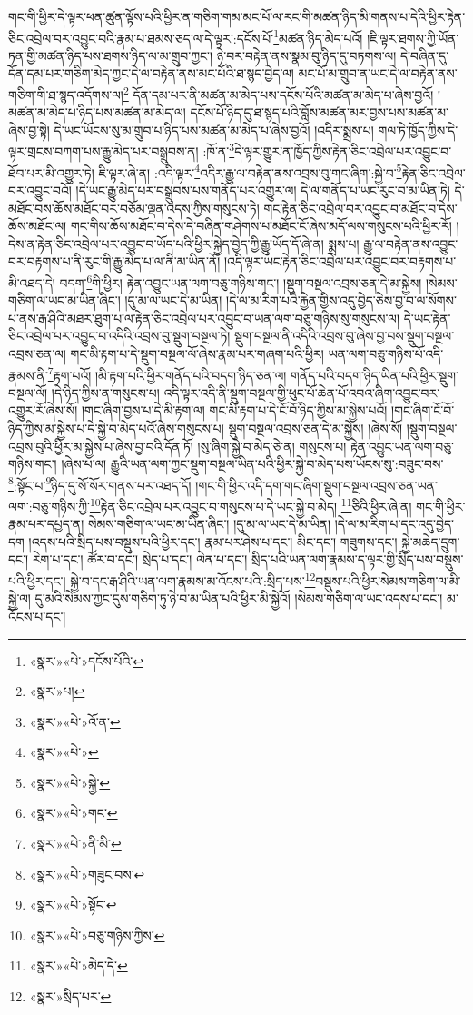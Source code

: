 གང་གི་ཕྱིར་དེ་ལྟར་ཕན་ཚུན་ལྟོས་པའི་ཕྱིར་ན་གཅིག་གམ་མང་པོ་ལ་རང་གི་མཚན་ཉིད་མི་གནས་པ་དེའི་ཕྱིར་རྟེན་ཅིང་འབྲེལ་བར་འབྱུང་བའི་རྣམ་པ་ཐམས་ཅད་ལ་དེ་ལྟར་:དངོས་པོ་\footnote{«སྣར་»«པེ་»དངོས་པོའི་}མཚན་ཉིད་མེད་པའོ། །ཇི་ལྟར་ཐགས་ཀྱི་ཡོན་ཏན་གྱི་མཚན་ཉིད་པས་ཐགས་ཉིད་ལ་མ་གྲུབ་ཀྱང་། ཉེ་བར་བརྟེན་ནས་སྣམ་བུ་ཉིད་དུ་བཏགས་ལ། དེ་བཞིན་དུ་དོན་དམ་པར་གཅིག་མེད་ཀྱང་དེ་ལ་བརྟེན་ནས་མང་པོའི་ཐ་སྙད་བྱེད་ལ། མང་པོ་མ་གྲུབ་ན་ཡང་དེ་ལ་བརྟེན་ནས་གཅིག་གི་ཐ་སྙད་འདོགས་ལ།\footnote{«སྣར་»པ།} དོན་དམ་པར་ནི་མཚན་མ་མེད་པས་དངོས་པོའི་མཚན་མ་མེད་པ་ཞེས་བྱའོ། །མཚན་མ་མེད་པ་ཉིད་པས་མཚན་མ་མེད་ལ། དངོས་པོ་ཉིད་དུ་ཐ་སྙད་པའི་བློས་མཚན་མར་བྱས་པས་མཚན་མ་ཞེས་བྱ་སྟེ། དེ་ཡང་ཡོངས་སུ་མ་གྲུབ་པ་ཉིད་པས་མཚན་མ་མེད་པ་ཞེས་བྱའོ། །འདིར་སྨྲས་པ། གལ་ཏེ་ཁྱོད་ཀྱིས་དེ་ལྟར་གྲངས་བཀག་པས་རྒྱུ་མེད་པར་བསྒྲུབས་ན། :ཁོ་ན་\footnote{«སྣར་»«པེ་»འོ་ན་}དེ་ལྟར་གྱུར་ན་ཁྱོད་ཀྱིས་རྟེན་ཅིང་འབྲེལ་པར་འབྱུང་བ་ཐོབ་པར་མི་འགྱུར་ཏེ། ཇི་ལྟར་ཞེ་ན། :འདི་ལྟར་\footnote{«སྣར་»«པེ་»}འདིར་རྒྱུ་ལ་བརྟེན་ནས་འབྲས་བུ་གང་ཞིག་:སྐྱེ་བ་\footnote{«སྣར་»«པེ་»སྐྱེ་}རྟེན་ཅིང་འབྲེལ་བར་འབྱུང་བའོ། །དེ་ཡང་རྒྱུ་མེད་པར་བསྒྲུབས་པས་གནོད་པར་འགྱུར་ལ། དེ་ལ་གནོད་པ་ཡང་རུང་བ་མ་ཡིན་ཏེ། དེ་མཐོང་བས་ཆོས་མཐོང་བར་བཅོམ་ལྡན་འདས་ཀྱིས་གསུངས་ཏེ། གང་རྟེན་ཅིང་འབྲེལ་བར་འབྱུང་བ་མཐོང་བ་དེས་ཆོས་མཐོང་ལ། གང་གིས་ཆོས་མཐོང་བ་དེས་དེ་བཞིན་གཤེགས་པ་མཐོང་ངོ་ཞེས་མདོ་ལས་གསུངས་པའི་ཕྱིར་རོ། །དེས་ན་རྟེན་ཅིང་འབྲེལ་པར་འབྱུང་བ་ཡོད་པའི་ཕྱིར་སྐྱེད་བྱེད་ཀྱི་རྒྱུ་ཡོད་དོ་ཞེ་ན། སྨྲས་པ། རྒྱུ་ལ་བརྟེན་ནས་འབྱུང་བར་བརྟགས་པ་ནི་རུང་གི་རྒྱུ་མེད་པ་ལ་ནི་མ་ཡིན་ནོ། །འདི་ལྟར་ཡང་རྟེན་ཅིང་འབྲེལ་པར་འབྱུང་བར་བརྟགས་པ་མི་འཐད་དེ། བདག་\footnote{«སྣར་»«པེ་»གང་}གི་ཕྱིར། རྟེན་འབྱུང་ཡན་ལག་བཅུ་གཉིས་གང་། །སྡུག་བསྔལ་འབྲས་ཅན་དེ་མ་སྐྱེས། །སེམས་གཅིག་ལ་ཡང་མ་ཡིན་ཞིང་། །དུ་མ་ལ་ཡང་དེ་མ་ཡིན། །དེ་ལ་མ་རིག་པའི་རྐྱེན་གྱིས་འདུ་བྱེད་ཅེས་བྱ་བ་ལ་སོགས་པ་ནས་རྒ་ཤིའི་མཐར་ཐུག་པ་ལ་རྟེན་ཅིང་འབྲེལ་པར་འབྱུང་བ་ཡན་ལག་བཅུ་གཉིས་སུ་གསུངས་ལ། དེ་ཡང་རྟེན་ཅིང་འབྲེལ་པར་འབྱུང་བ་འདིའི་འབྲས་བུ་སྡུག་བསྔལ་ཏེ། སྡུག་བསྔལ་ནི་འདིའི་འབྲས་བུ་ཞེས་བྱ་བས་སྡུག་བསྔལ་འབྲས་ཅན་ལ། གང་མི་རྟག་པ་དེ་སྡུག་བསྔལ་ལོ་ཞེས་རྣམ་པར་གཞག་པའི་ཕྱིར། ཡན་ལག་བཅུ་གཉིས་པོ་འདི་རྣམས་ནི་\footnote{«སྣར་»«པེ་»ནི་མི་}རྟག་པའོ། །མི་རྟག་པའི་ཕྱིར་གནོད་པའི་བདག་ཉིད་ཅན་ལ། གནོད་པའི་བདག་ཉིད་ཡིན་པའི་ཕྱིར་སྡུག་བསྔལ་ལོ། །དེ་ཉིད་ཀྱིས་ན་གསུངས་པ། འདི་ལྟར་འདི་ནི་སྡུག་བསྔལ་གྱི་ཕུང་པོ་ཆེན་པོ་འབའ་ཞིག་འབྱུང་བར་འགྱུར་རོ་ཞེས་སོ། །གང་ཞིག་བྱས་པ་དེ་མི་རྟག་ལ། གང་མི་རྟག་པ་དེ་ངོ་བོ་ཉིད་ཀྱིས་མ་སྐྱེས་པའོ། །གང་ཞིག་ངོ་བོ་ཉིད་ཀྱིས་མ་སྐྱེས་པ་དེ་སྐྱེ་བ་མེད་པའོ་ཞེས་གསུངས་པ། སྡུག་བསྔལ་འབྲས་ཅན་དེ་མ་སྐྱེས། །ཞེས་སོ། །སྡུག་བསྔལ་འབྲས་བུའི་ཕྱིར་མ་སྐྱེས་པ་ཞེས་བྱ་བའི་དོན་ཏོ། །སུ་ཞིག་སྐྱེ་བ་མེད་ཅེ་ན། གསུངས་པ། རྟེན་འབྱུང་ཡན་ལག་བཅུ་གཉིས་གང་། །ཞེས་པ་ལ། རྒྱུའི་ཡན་ལག་ཀྱང་སྡུག་བསྔལ་ཡིན་པའི་ཕྱིར་སྐྱེ་བ་མེད་པས་ཡོངས་སུ་:བཟུང་བས་\footnote{«སྣར་»«པེ་»གཟུང་བས་}:སྟོང་པ་\footnote{«སྣར་»«པེ་»སྟོང་}ཉིད་དུ་སོ་སོར་གནས་པར་འཐད་དོ། །གང་གི་ཕྱིར་འདི་དག་གང་ཞིག་སྡུག་བསྔལ་འབྲས་ཅན་ཡན་ལག་:བཅུ་གཉིས་ཀྱི་\footnote{«སྣར་»«པེ་»བཅུ་གཉིས་ཀྱིས་}རྟེན་ཅིང་འབྲེལ་པར་འབྱུང་བ་གསུངས་པ་དེ་ཡང་སྐྱེ་བ་མེད། \footnote{«སྣར་»«པེ་»མེད་དེ་}ཅིའི་ཕྱིར་ཞེ་ན། གང་གི་ཕྱིར་རྣམ་པར་དཔྱད་ན། སེམས་གཅིག་ལ་ཡང་མ་ཡིན་ཞིང་། །དུ་མ་ལ་ཡང་དེ་མ་ཡིན། །དེ་ལ་མ་རིག་པ་དང་འདུ་བྱེད་དག །འདས་པའི་སྲིད་པས་བསྡུས་པའི་ཕྱིར་དང་། རྣམ་པར་ཤེས་པ་དང་། མིང་དང་། གཟུགས་དང་། སྐྱེ་མཆེད་དྲུག་དང་། རེག་པ་དང་། ཚོར་བ་དང་། སྲེད་པ་དང་། ལེན་པ་དང་། སྲིད་པའི་ཡན་ལག་རྣམས་ད་ལྟར་གྱི་སྲིད་པས་བསྡུས་པའི་ཕྱིར་དང་། སྐྱེ་བ་དང་རྒ་ཤིའི་ཡན་ལག་རྣམས་མ་འོངས་པའི་:སྲིད་པས་\footnote{«སྣར་»སྲིད་པར་}བསྡུས་པའི་ཕྱིར་སེམས་གཅིག་ལ་མི་སྐྱེ་ལ། དུ་མའི་སེམས་ཀྱང་དུས་གཅིག་ཏུ་ཉེ་བ་མ་ཡིན་པའི་ཕྱིར་མི་སྐྱེའོ། །སེམས་གཅིག་ལ་ཡང་འདས་པ་དང་། མ་འོངས་པ་དང་། 